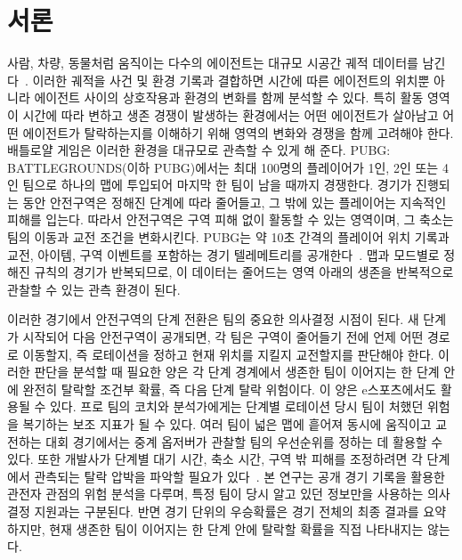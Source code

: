\section{서론}
\label{sec:introduction}

사람, 차량, 동물처럼 움직이는 다수의 에이전트는 대규모 시공간 궤적 데이터를 남긴다~\cite{Zheng15,Atluri18}.
이러한 궤적을 사건 및 환경 기록과 결합하면 시간에 따른 에이전트의 위치뿐 아니라 에이전트 사이의 상호작용과 환경의 변화를 함께 분석할 수 있다.
특히 활동 영역이 시간에 따라 변하고 생존 경쟁이 발생하는 환경에서는 어떤 에이전트가 살아남고 어떤 에이전트가 탈락하는지를 이해하기 위해 영역의 변화와 경쟁을 함께 고려해야 한다.
배틀로얄 게임은 이러한 환경을 대규모로 관측할 수 있게 해 준다.
PUBG: BATTLEGROUNDS(이하 PUBG)에서는 최대 100명의 플레이어가 1인, 2인 또는 4인 팀으로 하나의 맵에 투입되어 마지막 한 팀이 남을 때까지 경쟁한다.
경기가 진행되는 동안 안전구역은 정해진 단계에 따라 줄어들고, 그 밖에 있는 플레이어는 지속적인 피해를 입는다.
따라서 안전구역은 구역 피해 없이 활동할 수 있는 영역이며, 그 축소는 팀의 이동과 교전 조건을 변화시킨다.
PUBG는 약 10초 간격의 플레이어 위치 기록과 교전, 아이템, 구역 이벤트를 포함하는 경기 텔레메트리를 공개한다~\cite{PUBGAPI}.
맵과 모드별로 정해진 규칙의 경기가 반복되므로, 이 데이터는 줄어드는 영역 아래의 생존을 반복적으로 관찰할 수 있는 관측 환경이 된다.

이러한 경기에서 안전구역의 단계 전환은 팀의 중요한 의사결정 시점이 된다.
새 단계가 시작되어 다음 안전구역이 공개되면, 각 팀은 구역이 줄어들기 전에 언제 어떤 경로로 이동할지, 즉 로테이션을 정하고 현재 위치를 지킬지 교전할지를 판단해야 한다.
이러한 판단을 분석할 때 필요한 양은 각 단계 경계에서 생존한 팀이 이어지는 한 단계 안에 완전히 탈락할 조건부 확률, 즉 다음 단계 탈락 위험이다.
이 양은 e스포츠에서도 활용될 수 있다.
프로 팀의 코치와 분석가에게는 단계별 로테이션 당시 팀이 처했던 위험을 복기하는 보조 지표가 될 수 있다.
여러 팀이 넓은 맵에 흩어져 동시에 움직이고 교전하는 대회 경기에서는 중계 옵저버가 관찰할 팀의 우선순위를 정하는 데 활용할 수 있다.
또한 개발사가 단계별 대기 시간, 축소 시간, 구역 밖 피해를 조정하려면 각 단계에서 관측되는 탈락 압박을 파악할 필요가 있다~\cite{PUBGBlueZone2026}.
본 연구는 공개 경기 기록을 활용한 관전자 관점의 위험 분석을 다루며, 특정 팀이 당시 알고 있던 정보만을 사용하는 의사결정 지원과는 구분된다.
반면 경기 단위의 우승확률은 경기 전체의 최종 결과를 요약하지만, 현재 생존한 팀이 이어지는 한 단계 안에 탈락할 확률을 직접 나타내지는 않는다.

